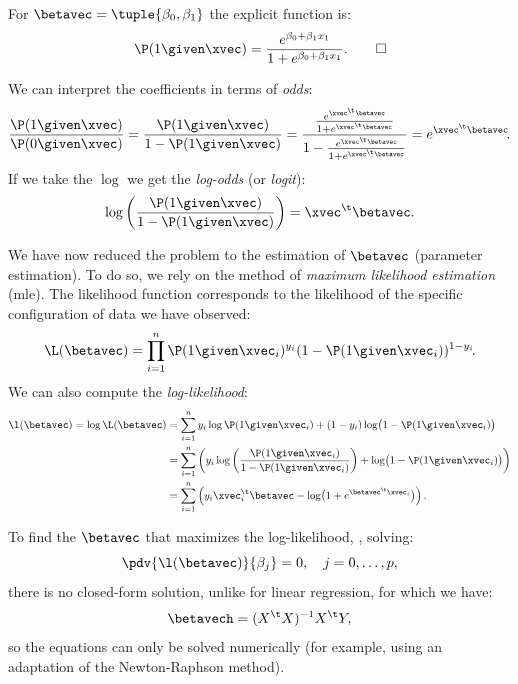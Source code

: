\begin{example}
    For $\betavec = \tuple{\beta_0, \beta_1}$ the explicit function is:
    \begin{equation}
        \P(1 \given \xvec) = \frac{e^{\beta_0 + \beta_1 x_1}}{1 + e^{\beta_0 + \beta_1 x_1}}.\qedhere
    \end{equation}
\end{example}

We can interpret the coefficients in terms of \emph{odds}:
\begin{equation}
    \frac{\P(1\given \xvec)}{\P(0\given \xvec)} = \frac{\P(1\given \xvec)}{1 - \P(1\given \xvec)} = \frac{\frac{e^{\xvec^\t\betavec}}{1 + e^{\xvec^\t\betavec}}}{1 - \frac{e^{\xvec^\t\betavec}}{1 + e^{\xvec^\t\betavec}}} = e^{\xvec^\t\betavec}\negthinspace.
\end{equation}
If we take the $\log$ we get the \emph{log-odds} (or \emph{logit}):
\begin{equation}
    \log\left(\frac{\P(1\given \xvec)}{1 - \P(1\given \xvec)}\right) = \xvec^\t\betavec.
\end{equation}

We have now reduced the problem to the estimation of $\betavec$ (parameter estimation). To do so, we rely on the method of \emph{maximum likelihood estimation} (\acs{mle}). The likelihood function corresponds to the likelihood of the specific configuration of data we have observed:
\begin{equation}
    \L(\betavec) = \prod_{i = 1}^n \P(1 \given \xvec_i)^{y_i} (1 - \P(1 \given \xvec_i))^{1 - y_i}\negthinspace.
\end{equation}
We can also compute the \emph{log-likelihood}:
\begin{equation}
    \begin{aligned}
        \l(\betavec) = \log\L(\betavec) & = \sum_{i = 1}^n y_i\log \P(1 \given \xvec_i) + (1 - y_i)\log\bigl(1 - \P(1 \given \xvec_i)\bigr) \\
                                     & = \sum_{i = 1}^n \left(y_i\log\left(\frac{\P(1 \given \xvec_i)}{1 - \P(1 \given \xvec_i)}\right) + \log\bigl(1 - \P(1 \given \xvec_i)\bigr)\right)\\
                                     & = \sum_{i = 1}^n \left(y_i \xvec_i^\t \betavec - \log\bigl(1 + e^{\betavec^\t \xvec_i}\bigr)\right).
    \end{aligned}
\end{equation}

To find the $\betavec$ that maximizes the log-likelihood, \ie, solving:
\begin{equation}
    \pdv{\l(\betavec)}{\beta_j} = 0, \quad j = 0, \ldots, p,
\end{equation}
there is no closed-form solution, unlike for linear regression, for which we have:
\begin{equation}
    \betavech = (X^\t X)^{-1} X^\t Y\negthinspace,
\end{equation}
so the equations can only be solved numerically (for example, using an adaptation of the Newton-Raphson method). 

